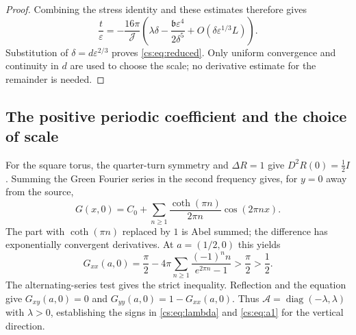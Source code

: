 \documentclass[11pt,reqno]{amsart}
\numberwithin{equation}{section}
\theoremstyle{definition}
\theoremstyle{remark}
\newcommand{\eps}{\varepsilon}
\newcommand{\calA}{\mathcal A}
\begin{document}
\begin{proof}
Combining the stress identity and these estimates therefore gives
\[
 \frac{t}{\eps}
   =-\frac{16\pi}{\mathcal J}
        \left(\lambda\delta-\frac{\mathfrak b\eps^4}{2\delta^5}
                         +O(\delta\eps^{1/3}L)\right).
\]
Substitution of $\delta=d\eps^{2/3}$ proves \eqref{cs:eq:reduced}.
Only uniform convergence and continuity in $d$ are used to choose
the scale; no derivative estimate for the remainder is needed.
\end{proof}

\subsection{The positive periodic coefficient and the choice of scale}

For the square torus, the quarter-turn symmetry and $\Delta R=1$
give $D^2R(0)=\frac12I$. Summing the Green Fourier series in the
second frequency gives, for $y=0$ away from the source,
\[
 G(x,0)=C_0+\sum_{n\ge1}\frac{\coth(\pi n)}{2\pi n}\cos(2\pi nx).
\]
The part with $\coth(\pi n)$ replaced by $1$ is Abel summed; the
difference has exponentially convergent derivatives.
At $a=(1/2,0)$ this yields
\begin{equation}\label{cs:eq:Gxx}
 G_{xx}(a,0)=\frac\pi2
       -4\pi\sum_{n\ge1}\frac{(-1)^n n}{e^{2\pi n}-1}>\frac\pi2>\frac12.
\end{equation}
The alternating-series test gives the strict inequality.
Reflection and the equation give $G_{xy}(a,0)=0$ and
$G_{yy}(a,0)=1-G_{xx}(a,0)$. Thus
$\calA=\operatorname{diag}(-\lambda,\lambda)$ with $\lambda>0$,
establishing the signs in \eqref{cs:eq:lambda} and \eqref{cs:eq:a1}
for the vertical direction.
\end{document}
